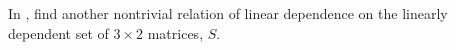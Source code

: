 In , find another nontrivial relation of linear dependence on the linearly dependent set of $3\times 2$ matrices, $S$.